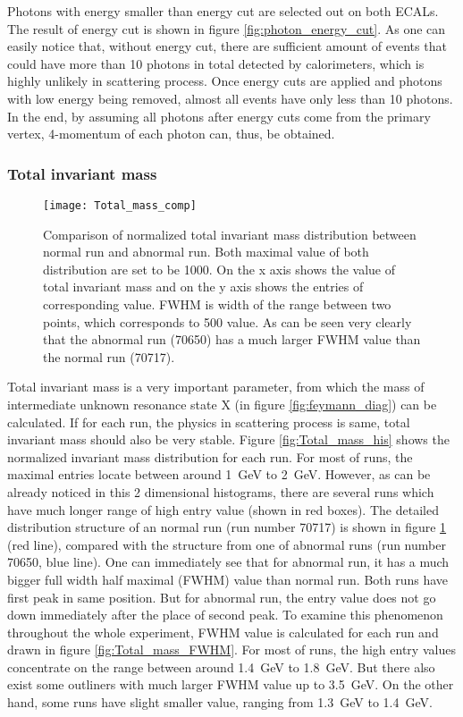 Photons with energy smaller than energy cut are selected out on both ECALs. The result of energy cut is shown in figure \ref{fig:photon_energy_cut}. As one can easily notice that, without energy cut, there are sufficient amount of events that could have more than 10 photons in total detected by calorimeters, which is highly unlikely in scattering process. Once energy cuts are applied and photons with low energy being removed, almost all events have only less than 10 photons. In the end, by assuming all photons after energy cuts come from the primary vertex, 4-momentum of each photon can, thus, be obtained.
\subsubsection{Total invariant mass}
\begin{figure}[!b]
	\centering
	\texttt{[image: Total\_mass\_comp]}
	\caption{Comparison of normalized total invariant mass distribution between normal run and abnormal run. Both maximal value of both distribution are set to be 1000. On the x axis shows the value of total invariant mass and on the y axis shows the entries of corresponding value. FWHM is width of the range between two points, which corresponds to 500 value. As can be seen very clearly that the abnormal run (70650) has a much larger FWHM value than the normal run (70717).}
	\label{fig:Total_mass_comp}
\end{figure}
Total invariant mass is a very important parameter, from which the mass of intermediate unknown resonance state X (in figure \ref{fig:feymann_diag}) can be calculated. If for each run, the physics in scattering process is same, total invariant mass should also be very stable. Figure \ref{fig:Total_mass_his} shows the normalized invariant mass distribution for each run. For most of runs, the maximal entries locate between around \SI{1}{\giga\electronvolt} to \SI{2}{\giga\electronvolt}. However, as can be already noticed in this 2 dimensional histograms, there are several runs which have much longer range of high entry value (shown in red boxes). The detailed distribution structure of an normal run (run number 70717) is shown in figure \ref{fig:Total_mass_comp} (red line), compared with the structure from one of abnormal runs (run number 70650, blue line). One can immediately see that for abnormal run, it has a much bigger full width half maximal (FWHM) value than normal run. Both runs have first peak in same position. But for abnormal run, the entry value does not go down immediately after the place of second peak. To examine this phenomenon throughout the whole experiment, FWHM value is calculated for each run and drawn in figure \ref{fig:Total_mass_FWHM}. For most of runs, the high entry values concentrate on the range between around \SI{1.4}{\giga\electronvolt} to \SI{1.8}{\giga\electronvolt}. But there also exist some outliners with much larger FWHM value up to \SI{3.5}{\giga\electronvolt}. On the other hand, some runs have slight smaller value, ranging from \SI{1.3}{\giga\electronvolt} to \SI{1.4}{\giga\electronvolt}.

